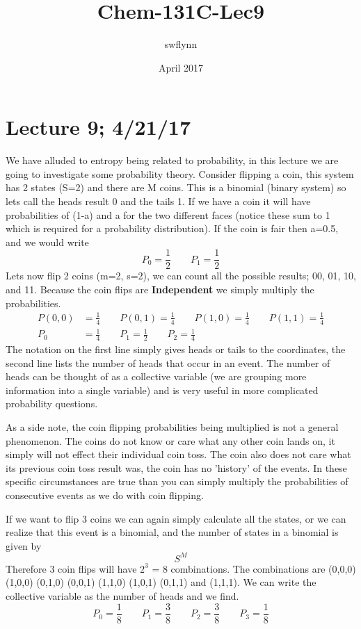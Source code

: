 \documentclass{article}
\title{Chem-131C-Lec9}
\author{swflynn }
\date{April 2017}
\begin{document}
\maketitle

\section*{Lecture 9; 4/21/17}
We have alluded to entropy being related to probability, in this lecture we are going to investigate some probability theory. 
Consider flipping a coin, this system has 2 states (S=2) and there are M coins. 
This is a binomial (binary system) so lets call the heads result 0 and the tails 1. 
If we have a coin it will have probabilities of (1-a) and a for the two different faces (notice these sum to 1 which is required for a probability distribution). 
If the coin is fair then a=0.5, and we would write
\begin{equation}
    P_0 = \frac{1}{2} \qquad P_1 = \frac{1}{2}
\end{equation}
Lets now flip 2 coins (m=2, s=2), we can count all the possible results; 00, 01, 10, and 11. 
Because the coin flips are \textbf{Independent} we simply multiply the probabilities. 
\begin{equation}
\begin{split}
    P(0,0) &= \frac{1}{4} \qquad P(0,1) = \frac{1}{4} \qquad P(1,0) = \frac{1}{4} \qquad P(1,1) = \frac{1}{4} \\
    P_0 &= \frac{1}{4} \qquad P_1 = \frac{1}{2}  \qquad P_2 = \frac{1}{4}
    \end{split}
\end{equation}
The notation on the first line simply gives heads or tails to the coordinates, the second line lists the number of heads that occur in an event. 
The number of heads can be thought of as a collective variable (we are grouping more information into a single variable) and is very useful in more complicated probability questions. 

As a side note, the coin flipping probabilities being multiplied is not a general phenomenon. 
The coins do not know or care what any other coin lands on, it simply will not effect their individual coin toss. 
The coin also does not care what its previous coin toss result was, the coin has no 'history' of the events. 
In these specific circumstances are true than you can simply multiply the probabilities of consecutive events as we do with coin flipping. 

If we want to flip 3 coins we can again simply calculate all the states, or we can realize that this event is a binomial, and the number of states in a binomial is given by 
\begin{equation}
S^M
\end{equation}
Therefore 3 coin flips will have $2^3$ = 8 combinations. 
The combinations are (0,0,0) (1,0,0) (0,1,0) (0,0,1) (1,1,0) (1,0,1) (0,1,1) and (1,1,1). 
We can write the collective variable as the number of heads and we find. 
\begin{equation}
P_0 = \frac{1}{8} \qquad P_1 = \frac{3}{8} \qquad P_2=\frac{3}{8} \qquad P_3=\frac{1}{8}
\end{equation}
\end{document}
